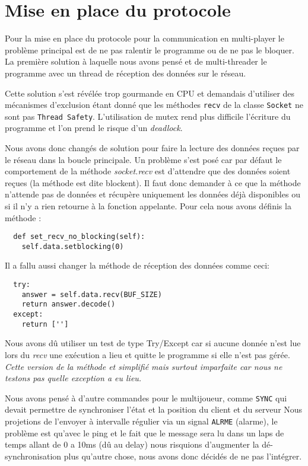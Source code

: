 \documentclass[12pt]{report}
\begin{document}
\chapter{Mise en place du protocole}
Pour la mise en place du protocole pour la communication en multi-player le
problème principal est de ne pas ralentir le programme ou de ne pas le bloquer.
La première solution à laquelle nous avons pensé et de multi-threader le
programme avec un thread de réception des données sur le réseau.

Cette solution s'est révélée trop gourmande en CPU et demandais d'utiliser des
mécanismes d'exclusion étant donné que les méthodes \texttt{recv} de la classe
\texttt{Socket} ne sont pas \texttt{Thread Safety}.
L'utilisation de mutex rend plus difficile l'écriture du programme et l'on
prend le risque d'un \textit{deadlock}.

Nous avons donc changés de solution pour faire la lecture des données reçues
par le réseau dans la boucle principale.
Un problème s'est posé car par défaut le comportement de la
méthode \textit{socket.recv} est d'attendre que des données soient reçues (la
méthode est dite blockent). Il faut donc demander à ce que la méthode
n'attende pas de données et récupère uniquement les données déjà
disponibles ou si il n'y a rien retourne à la fonction appelante.
Pour cela nous avons définis la méthode :
\begin{verbatim}
  def set_recv_no_blocking(self):
    self.data.setblocking(0)
\end{verbatim}

Il a fallu aussi changer la méthode de réception des données comme ceci:
\begin{verbatim}
  try:
    answer = self.data.recv(BUF_SIZE)
    return answer.decode()
  except:
    return ['']
\end{verbatim}

Nous avons dû utiliser un test de type Try/Except car si aucune donnée n'est lue
lors du \textit{recv} une exécution a lieu et quitte le programme si elle
n'est pas gérée.
\textit{Cette version de la méthode et simplifié mais surtout imparfaite
  car nous ne testons pas quelle exception a eu lieu.}

Nous avons pensé à d'autre commandes pour le multijoueur, comme \texttt{SYNC} qui
devait permettre de synchroniser l'état et la position du client et du serveur
Nous projetions de l'envoyer à intervalle régulier via un signal \texttt{ALRME} (alarme),
le problème est qu'avec le ping et le fait que le message sera lu dans un laps
de temps allant de 0 a 10ms (dû au delay) nous risquions d'augmenter la
dé-synchronisation plus qu'autre chose, nous avons donc décidés de ne
pas l'intégrer.
\end{document}
